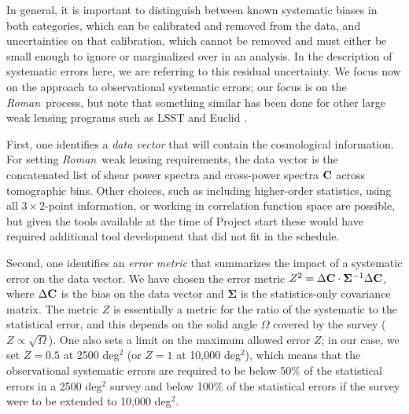 \documentclass[usenatbib]{mnras}
\newcommand{\wfirst}{{\slshape Roman}}
\begin{document}
In general, it is important to distinguish between known systematic biases in both categories, which can be calibrated and removed from the data, and uncertainties on that calibration, which cannot be removed and must either be small enough to ignore or marginalized over in an analysis. In the description of systematic errors here, we are referring to this residual uncertainty. We focus now on the approach to observational systematic errors; our focus is on the \wfirst\ process, but note that something similar has been done for other large weak lensing programs such as LSST and Euclid \citep{euclid_srd,2016SPIE.9911E..05V,LPM-17,2018arXiv180901669T,LSE-29}.

First, one identifies a {\em data vector} that will contain the cosmological information. For setting \wfirst\ weak lensing requirements, the data vector is the concatenated list of shear power spectra and cross-power spectra ${\bf C}$ across tomographic bins. Other choices, such as including higher-order statistics, using all $3\times 2$-point information, or working in correlation function space are possible, but given the tools available at the time of Project start these would have required additional tool development that did not fit in the schedule.

Second, one identifies an {\em error metric} that summarizes the impact of a systematic error on the data vector. We have chosen the error metric $Z^2 = \Delta{\bf C}\cdot{\boldsymbol\Sigma}^{-1}\Delta{\bf C}$, where $\Delta{\bf C}$ is the bias on the data vector and ${\boldsymbol\Sigma}$ is the statistics-only covariance matrix. The metric $Z$ is essentially a metric for the ratio of the systematic to the statistical error, and this depends on the solid angle $\Omega$ covered by the survey ($Z\propto \sqrt\Omega$). One also sets a limit on the maximum allowed error $Z$; in our case, we set $Z=0.5$ at 2500 deg$^2$ (or $Z=1$ at 10,000 deg$^2$), which means that the observational systematic errors are required to be below 50\% of the statistical errors in a 2500 deg$^2$ survey and below 100\% of the statistical errors if the survey were to be extended to 10,000 deg$^2$. 
\end{document}
